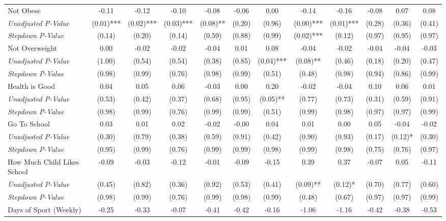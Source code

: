 \begin{tabular}{l c c c c c c c c c c c}
Not Obese & -0.11 & -0.12 & -0.10 & -0.08 & -0.06 & 0.00 & -0.14 & -0.16 & -0.08 & 0.07 & 0.08 \\
\quad \textit{Unadjusted P-Value} & (0.01)*** & (0.02)*** & (0.03)*** & (0.08)** & (0.20) & (0.96) & (0.00)*** & (0.01)*** & (0.28) & (0.36) & (0.41) \\
\quad \textit{Stepdown P-Value} & (0.14) & (0.20) & (0.14) & (0.59) & (0.88) & (0.99) & (0.02)*** & (0.12) & (0.97) & (0.95) & (0.97) \\
Not Overweight & 0.00 & -0.02 & -0.02 & -0.04 & 0.01 & 0.08 & -0.04 & -0.02 & -0.04 & -0.04 & -0.03 \\
\quad \textit{Unadjusted P-Value} & (1.00) & (0.54) & (0.54) & (0.38) & (0.85) & (0.04)*** & (0.08)** & (0.46) & (0.18) & (0.20) & (0.47) \\
\quad \textit{Stepdown P-Value} & (0.98) & (0.99) & (0.76) & (0.98) & (0.99) & (0.51) & (0.48) & (0.98) & (0.94) & (0.86) & (0.99) \\
Health is Good & 0.04 & 0.05 & 0.06 & -0.03 & 0.00 & 0.20 & -0.02 & -0.04 & 0.10 & 0.06 & 0.01 \\
\quad \textit{Unadjusted P-Value} & (0.53) & (0.42) & (0.37) & (0.68) & (0.95) & (0.05)** & (0.77) & (0.73) & (0.31) & (0.59) & (0.91) \\
\quad \textit{Stepdown P-Value} & (0.98) & (0.99) & (0.76) & (0.99) & (0.99) & (0.51) & (0.99) & (0.98) & (0.97) & (0.97) & (0.99) \\
Go To School & 0.03 & 0.01 & 0.02 & -0.02 & -0.00 & 0.04 & 0.01 & 0.00 & 0.05 & -0.04 & -0.02 \\
\quad \textit{Unadjusted P-Value} & (0.30) & (0.79) & (0.38) & (0.59) & (0.91) & (0.42) & (0.90) & (0.93) & (0.17) & (0.12)* & (0.30) \\
\quad \textit{Stepdown P-Value} & (0.95) & (0.99) & (0.76) & (0.99) & (0.99) & (0.98) & (0.99) & (0.98) & (0.75) & (0.76) & (0.97) \\
How Much Child Likes School & -0.09 & -0.03 & -0.12 & -0.01 & -0.09 & -0.15 & 0.39 & 0.37 & -0.07 & 0.05 & -0.11 \\
\quad \textit{Unadjusted P-Value} & (0.45) & (0.82) & (0.36) & (0.92) & (0.53) & (0.41) & (0.09)** & (0.12)* & (0.70) & (0.77) & (0.60) \\
\quad \textit{Stepdown P-Value} & (0.98) & (0.99) & (0.76) & (0.99) & (0.98) & (0.99) & (0.48) & (0.67) & (0.97) & (0.97) & (0.99) \\
Days of Sport (Weekly) & -0.25 & -0.33 & -0.07 & -0.41 & -0.42 & -0.16 & -1.06 & -1.16 & -0.42 & -0.38 & -0.53 \\

\end{tabular}
